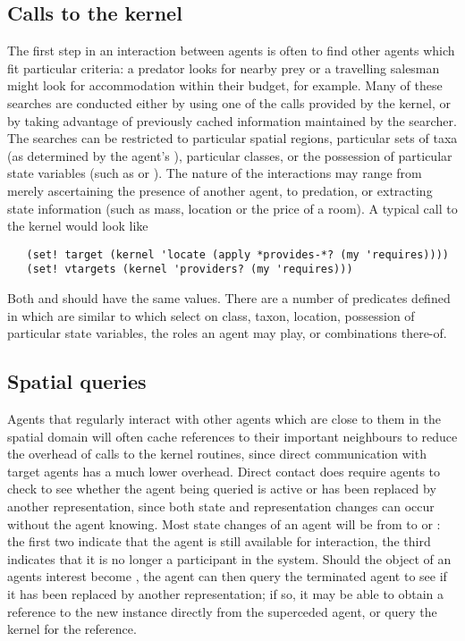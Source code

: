 \subsection{Calls to the kernel}\label{interactions}
The first step in an interaction between agents is often to find other
agents which fit particular criteria: a predator looks for nearby prey
or a travelling salesman might look for accommodation within their
budget, for example.  Many of these searches are conducted either by
using one of the  calls provided by the kernel, or by
taking advantage of previously cached information maintained by the
searcher. The searches can be restricted to particular spatial
regions, particular sets of taxa (as determined by the agent's
), particular classes, or the possession of particular
state variables (such as  or
). The nature of the interactions may range from
merely ascertaining the presence of another agent, to predation, or
extracting state information (such as mass, location or the price of a
room).  A typical call to the kernel would look like
\begin{verbatim}
   (set! target (kernel 'locate (apply *provides-*? (my 'requires))))
   (set! vtargets (kernel 'providers? (my 'requires)))
\end{verbatim}
Both  and  should have the same
values.  There are a number of predicates defined
in  which are similar to 
which select on class, taxon, location, possession of particular state
variables, the roles an agent may play, or combinations there-of.

\subsection{Spatial queries}
Agents that regularly interact with other agents which are close to
them in the spatial domain will often cache references to their
important neighbours to reduce the overhead of calls to the kernel
routines, since direct communication with target agents has a much
lower overhead. Direct contact does require agents to check to see
whether the agent being queried is active or has been replaced by
another representation, since both state and representation changes
can occur without the agent knowing. Most state changes of an agent
will be from  to 
or : the first two indicate that the agent is
still available for interaction, the third indicates that it is no
longer a participant in the system. Should the object of an agents
interest become , the agent can then query the
terminated agent to see if it has been replaced by another
representation; if so, it may be able to obtain a reference to the new
instance directly from the superceded agent, or query the kernel for
the reference.

